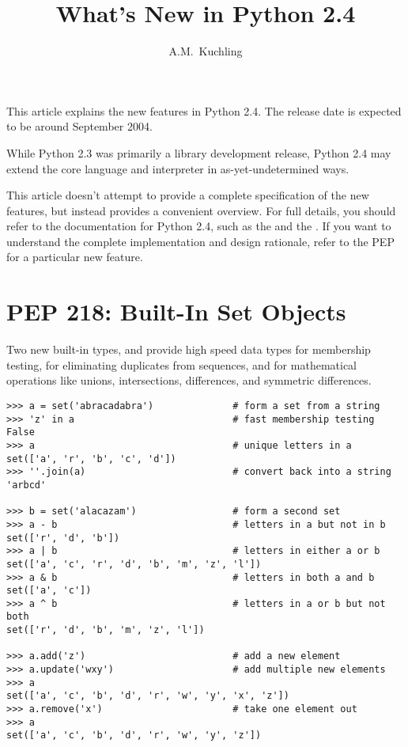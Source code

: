 \documentclass{howto}
\title{What's New in Python 2.4}
\author{A.M.\ Kuchling}
\begin{document}
\maketitle
\tableofcontents

This article explains the new features in Python 2.4.  The release
date is expected to be around September 2004.

While Python 2.3 was primarily a library development release, Python
2.4 may extend the core language and interpreter in
as-yet-undetermined ways.

This article doesn't attempt to provide a complete specification of
the new features, but instead provides a convenient overview.  For
full details, you should refer to the documentation for Python 2.4,
such as the  and
the .  
If you want to understand the complete implementation and design
rationale, refer to the PEP for a particular new feature.


\section{PEP 218: Built-In Set Objects}

Two new built-in types,  and
 provide high speed data types for
membership testing, for eliminating duplicates from sequences, and
for mathematical operations like unions, intersections, differences,
and symmetric differences.  

\begin{verbatim}
>>> a = set('abracadabra')              # form a set from a string
>>> 'z' in a                            # fast membership testing
False
>>> a                                   # unique letters in a
set(['a', 'r', 'b', 'c', 'd'])
>>> ''.join(a)                          # convert back into a string
'arbcd'

>>> b = set('alacazam')                 # form a second set
>>> a - b                               # letters in a but not in b
set(['r', 'd', 'b'])
>>> a | b                               # letters in either a or b
set(['a', 'c', 'r', 'd', 'b', 'm', 'z', 'l'])
>>> a & b                               # letters in both a and b
set(['a', 'c'])
>>> a ^ b                               # letters in a or b but not both
set(['r', 'd', 'b', 'm', 'z', 'l'])

>>> a.add('z')                          # add a new element
>>> a.update('wxy')                     # add multiple new elements
>>> a
set(['a', 'c', 'b', 'd', 'r', 'w', 'y', 'x', 'z'])       
>>> a.remove('x')                       # take one element out
>>> a
set(['a', 'c', 'b', 'd', 'r', 'w', 'y', 'z'])       
\end{verbatim}
\end{document}

